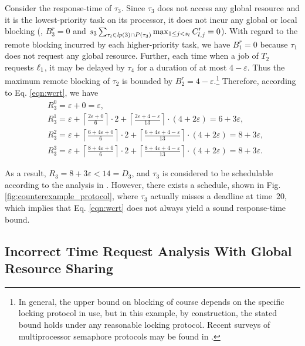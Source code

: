 Consider the response-time of $\tau_3$. Since $\tau_3$ does not access any global resource and it is the lowest-priority task on its processor, it does not incur any global or local blocking (\ie, $B_3^r = 0$ and $s_3 \sum_{\tau_l \in \mathit{lp}(3) \cap P(\tau_3)} \max_{1 \leq j < s_l} C_{l,j}^{\prime} = 0$). With regard to the remote blocking incurred by each higher-priority task, we have $B_1^r = 0$ because $\tau_1$ does not request any global resource. Further, each time when a job of $T_2$ requests $\ell_1$, it may be delayed by $\tau_4$ for a duration of at most $4-\varepsilon$. Thus the maximum remote blocking of $\tau_2$ is bounded by $B_2^r = 4-\varepsilon$.\footnote{In general, the upper bound on blocking of course depends on the specific locking protocol in use, but in this example, by construction, the stated bound holds under any reasonable locking protocol. Recent surveys of multiprocessor semaphore protocols may be found in \cite{bbb-2013,yang-2015}.} Therefore, according to Eq. \ref{eqn:wcrt}, we have
\begin{align*}
& R_3^0 = \varepsilon + 0 = \varepsilon, \\
& R_3^1 = \varepsilon + \left \lceil \frac{2\varepsilon + 0}{6} \right \rceil \cdot 2 + \left \lceil \frac{2\varepsilon + 4 - \varepsilon}{13} \right \rceil \cdot (4+2\varepsilon) =  6+3\varepsilon, \\
& R_3^2 = \varepsilon + \left \lceil \frac{6+4\varepsilon + 0}{6} \right \rceil \cdot 2 + \left \lceil \frac{6+4\varepsilon + 4-\varepsilon}{13} \right \rceil \cdot (4+2\varepsilon) = 8+3\varepsilon, \\
& R_3^3 = \varepsilon + \left \lceil \frac{8+4\varepsilon + 0}{6} \right \rceil \cdot 2 + \left \lceil \frac{8+4\varepsilon + 4-\varepsilon}{13} \right \rceil \cdot (4+2\varepsilon) = 8+3\varepsilon.
\end{align*}
 
As a result, $R_3 = 8+3\varepsilon < 14 = D_3$, and $\tau_3$ is considered to be schedulable according to the analysis in \cite{lakshmanan-2009}. However, there exists a schedule, shown in Fig. \ref{fig:counterexample_protocol}, where $\tau_3$  actually misses a deadline at time~20, which implies that Eq. \ref{eqn:wcrt} does not always yield a sound response-time bound. 

\subsection{Incorrect Time Request Analysis With Global Resource Sharing}

